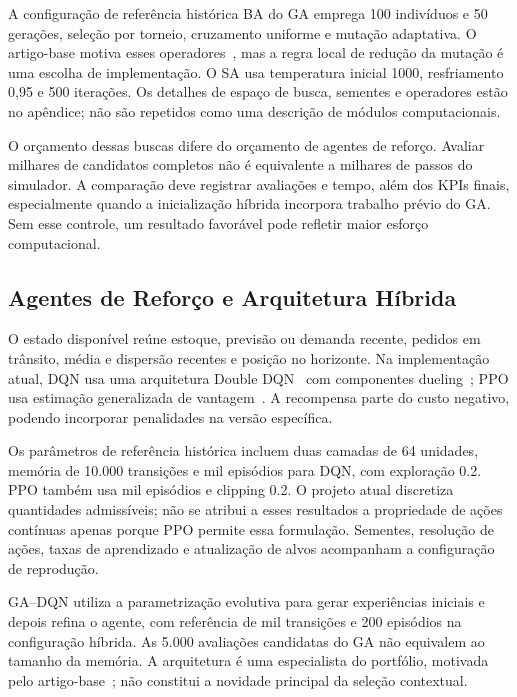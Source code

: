 A configuração de referência histórica BA do GA emprega 100 indivíduos e 50 gerações, seleção por torneio, cruzamento uniforme e mutação adaptativa. O artigo-base motiva esses operadores~\citep{Zabraoui2025GaDQN}, mas a regra local de redução da mutação é uma escolha de implementação. O SA usa temperatura inicial 1000, resfriamento 0,95 e 500 iterações. Os detalhes de espaço de busca, sementes e operadores estão no apêndice; não são repetidos como uma descrição de módulos computacionais.

O orçamento dessas buscas difere do orçamento de agentes de reforço. Avaliar milhares de candidatos completos não é equivalente a milhares de passos do simulador. A comparação deve registrar avaliações e tempo, além dos KPIs finais, especialmente quando a inicialização híbrida incorpora trabalho prévio do GA. Sem esse controle, um resultado favorável pode refletir maior esforço computacional.

\subsection{Agentes de Reforço e Arquitetura Híbrida}

O estado disponível reúne estoque, previsão ou demanda recente, pedidos em trânsito, média e dispersão recentes e posição no horizonte. Na implementação atual, DQN usa uma arquitetura Double DQN~\citep{VanHasselt2016DoubleDQN} com componentes dueling~\citep{Wang2016DuelingDQN}; PPO usa estimação generalizada de vantagem~\citep{Schulman2016GAE}. A recompensa parte do custo negativo, podendo incorporar penalidades na versão específica.

Os parâmetros de referência histórica incluem duas camadas de 64 unidades, memória de 10.000 transições e mil episódios para DQN, com exploração 0.2. PPO também usa mil episódios e clipping 0.2. O projeto atual discretiza quantidades admissíveis; não se atribui a esses resultados a propriedade de ações contínuas apenas porque PPO permite essa formulação. Sementes, resolução de ações, taxas de aprendizado e atualização de alvos acompanham a configuração de reprodução.

GA--DQN utiliza a parametrização evolutiva para gerar experiências iniciais e depois refina o agente, com referência de mil transições e 200 episódios na configuração híbrida. As 5.000 avaliações candidatas do GA não equivalem ao tamanho da memória. A arquitetura é uma especialista do portfólio, motivada pelo artigo-base~\citep{Zabraoui2025GaDQN}; não constitui a novidade principal da seleção contextual.

